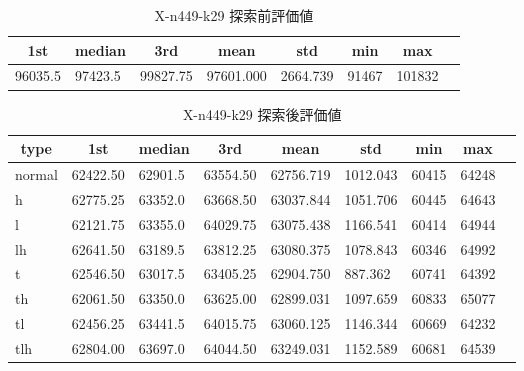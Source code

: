 \begin{table}[htbp]
    \caption{X-n449-k29 探索前評価値}
    \begin{tabular}{|l|l|l|l|l|l|l|l|}\hline
    \multicolumn{1}{|c|}{\textbf{1st}}
    &\multicolumn{1}{c|}{\textbf{median}}
    &\multicolumn{1}{c|}{\textbf{3rd}}
    &\multicolumn{1}{c|}{\textbf{mean}}
    &\multicolumn{1}{c|}{\textbf{std}}
    &\multicolumn{1}{c|}{\textbf{min}}
    &\multicolumn{1}{c|}{\textbf{max}}\\\hline
	96035.5 & 97423.5 & 99827.75 & 97601.000 & 2664.739 & 91467 & 101832\\\hline
	\end{tabular}
\end{table}
\begin{table}[htbp]
    \caption{X-n449-k29 探索後評価値}
    \begin{tabular}{|l|l|l|l|l|l|l|l|l|}\hline
    \multicolumn{1}{|c|}{\textbf{type}}
    &\multicolumn{1}{|c|}{\textbf{1st}}
    &\multicolumn{1}{c|}{\textbf{median}}
    &\multicolumn{1}{c|}{\textbf{3rd}}
    &\multicolumn{1}{c|}{\textbf{mean}}
    &\multicolumn{1}{c|}{\textbf{std}}
    &\multicolumn{1}{c|}{\textbf{min}}
    &\multicolumn{1}{c|}{\textbf{max}}\\\hline
	normal & 62422.50 & 62901.5 & 63554.50 & 62756.719 & 1012.043 & 60415 & 64248\\\hline
	h & 62775.25 & 63352.0 & 63668.50 & 63037.844 & 1051.706 & 60445 & 64643\\\hline
	l & 62121.75 & 63355.0 & 64029.75 & 63075.438 & 1166.541 & 60414 & 64944\\\hline
	lh & 62641.50 & 63189.5 & 63812.25 & 63080.375 & 1078.843 & 60346 & 64992\\\hline
	t & 62546.50 & 63017.5 & 63405.25 & 62904.750 & 887.362 & 60741 & 64392\\\hline
	th & 62061.50 & 63350.0 & 63625.00 & 62899.031 & 1097.659 & 60833 & 65077\\\hline
	tl & 62456.25 & 63441.5 & 64015.75 & 63060.125 & 1146.344 & 60669 & 64232\\\hline
	tlh & 62804.00 & 63697.0 & 64044.50 & 63249.031 & 1152.589 & 60681 & 64539\\\hline
	\end{tabular}
\end{table}
